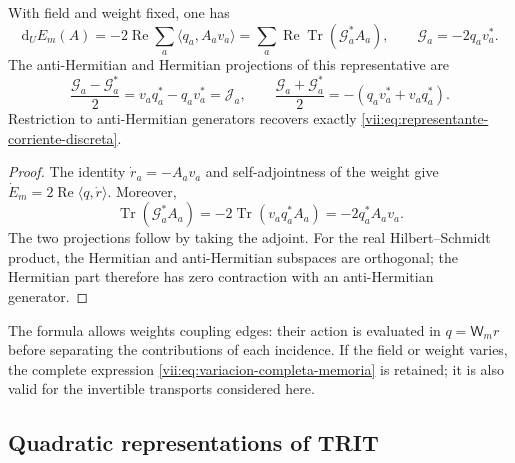 \begin{proposition}
\label{vii:prop:diferencial-invertible}
With field and weight fixed, one has
\begin{equation}
 \mathrm d_UE_m(A)=-2\operatorname{Re}\sum_a
       \langle q_a,A_av_a\rangle
 =\sum_a\operatorname{Re}\operatorname{Tr}(\mathcal G_a^*A_a),
 \qquad \mathcal G_a=-2q_av_a^*.
 \label{vii:eq:gradiente-transporte-completo}
\end{equation}
The anti-Hermitian and Hermitian projections of this representative are
\begin{equation}
 \frac{\mathcal G_a-\mathcal G_a^*}{2}
   =v_aq_a^*-q_av_a^*=\mathcal J_a,
 \qquad
 \frac{\mathcal G_a+\mathcal G_a^*}{2}
   =-(q_av_a^*+v_aq_a^*).
 \label{vii:eq:proyecciones-gradiente-memoria}
\end{equation}
Restriction to anti-Hermitian generators recovers exactly
\eqref{vii:eq:representante-corriente-discreta}.
\end{proposition}

\begin{proof}
The identity \(\dot r_a=-A_av_a\) and self-adjointness of the weight give
\(\dot E_m=2\operatorname{Re}\langle q,\dot r\rangle\).
Moreover,
\[
 \operatorname{Tr}(\mathcal G_a^*A_a)
 =-2\operatorname{Tr}(v_aq_a^*A_a)=-2q_a^*A_av_a.
\]
The two projections follow by taking the adjoint. For the real
Hilbert--Schmidt product, the Hermitian and anti-Hermitian subspaces
are orthogonal; the Hermitian part therefore has zero contraction with
an anti-Hermitian generator.
\end{proof}

The formula allows weights coupling edges: their action is evaluated in
\(q=\mathsf W_mr\) before separating the contributions of each
incidence. If the field or weight varies, the complete expression
\eqref{vii:eq:variacion-completa-memoria} is retained; it is also valid for
the invertible transports considered here.

\subsection{Quadratic representations of TRIT}

